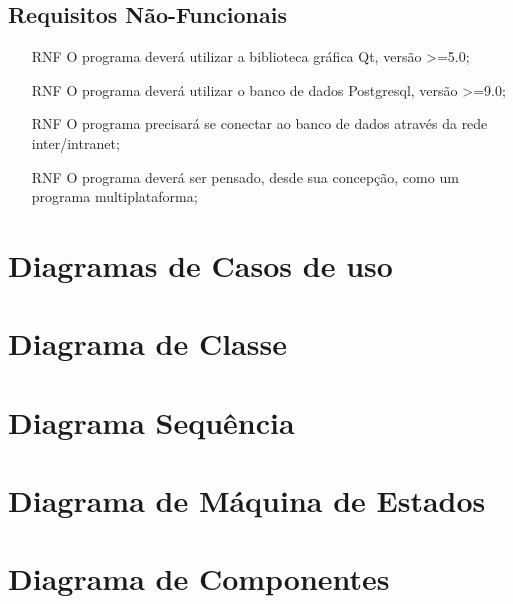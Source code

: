 \documentclass[12pt,openright,a4paper, article]{abntex2}
\begin{document}
    \subsection{Requisitos Não-Funcionais}
    \begin{enumerate}
        \item[RNF] O programa deverá utilizar a biblioteca gráfica Qt, versão >=5.0;
        \item[RNF] O programa deverá utilizar o banco de dados Postgresql, versão >=9.0;
        \item[RNF] O programa precisará se conectar ao banco de dados através da rede inter/intranet;
        \item[RNF] O programa deverá ser pensado, desde sua concepção, como um programa multiplataforma;
    \end{enumerate}
\section {Diagramas de Casos de uso}

\section {Diagrama de Classe}

\section {Diagrama Sequência}

\section {Diagrama de Máquina de Estados}

\section {Diagrama de Componentes}

\postextual


\end{document}
